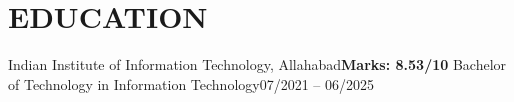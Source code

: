 % 
\vspace{-2pt}
\section{\large \textbf{EDUCATION}}
  \resumeSubHeadingListStart
    \resumeSubheading
      {Indian Institute of Information Technology, Allahabad}{\textbf {Marks: 8.53/10}}
      {Bachelor of Technology in Information Technology}{07/2021 – 06/2025}
    \vspace{-3.5pt}
  \resumeSubHeadingListEnd
